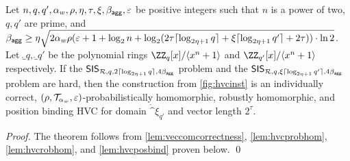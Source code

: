 \begin{theorem}\label{theo:veccom}
  Let $n,q,q',\alpha_w,\rho,\eta,\tau,\xi,\beta_{\mathsf{agg}},\varepsilon$ be positive integers such that $n$ is a power of two, $q,q'$ are prime, and 
$\beta_{\mathsf{agg}} \geq \eta\sqrt{2\alpha_w\rho(\varepsilon+1+\log_2 n + \log_2(2\tau \lceil\log_{2\eta+1}q\rceil + \xi\lceil\log_{2\eta+1}q'\rceil + 2\tau))\cdot\ln2}$. 
  Let $\ring_q,\ring_{q'}$ be the polynomial rings $\ZZ_q[x]/\langle x^n+1\rangle$ and $\ZZ_{q'}[x]/\langle x^n+1\rangle$ respectively.
  If the $\mathsf{SIS}_{\mathcal{R},q,2\lceil \log_{2\eta+1} q \rceil,4\beta_{\mathsf{agg}}}$ problem and the $\mathsf{SIS}_{\mathcal{R},q,\xi\lceil \log_{2\eta+1} q' \rceil,4\beta_{\mathsf{agg}}}$ problem are hard, then the construction from \autoref{fig:hvcinst} is an individually correct, $(\rho,\mathcal{T}_{\alpha_w},\varepsilon)$-probabilistically homomorphic, robustly homomorphic, and position binding HVC for domain $\ring^{\xi}_{q'}$ and vector length $2^\tau$.
\end{theorem}
\begin{proof}
  The theorem follows from \autoref{lem:veccomcorrectness}, \autoref{lem:hvcprobhom}, \autoref{lem:hvcrobhom}, and \autoref{lem:hvcposbind} proven below. \qed
\end{proof}

